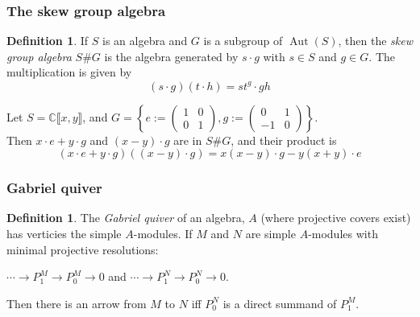 \documentclass[screen, aspectratio=43]{beamer}
\theoremstyle{definition}
\newtheorem{defin}[theorem]{Definition}
\newcommand{\C}{\mathbb{C}}
\DeclareMathOperator{\Aut}{Aut}
\begin{document}
\begin{frame}
	\frametitle{The skew group algebra}
	\begin{defin}
		If $S$ is an algebra and $G$ is a subgroup of $\Aut(S)$, then the \textit{skew group algebra} $S\#G$ is the algebra generated by $s \cdot g$ with $s \in S$ and $g \in G$. The multiplication is given by $$(s \cdot g)(t \cdot h) = s t^g \cdot gh$$
	\end{defin}
	\begin{example}
		Let $S= \C \llbracket x, y \rrbracket$, and $G = \left\{ e:= \begin{pmatrix}
		1 & 0\\
		0 & 1
		\end{pmatrix}, g:= \begin{pmatrix}
		0 & 1\\
		-1 & 0
		\end{pmatrix} \right\}$. \\
		Then $x \cdot e + y\cdot g$ and $(x-y) \cdot g$ are in $S\#G$, and their product is $$(x \cdot e + y\cdot g)((x-y) \cdot g) = x(x-y) \cdot g - y(x+y) \cdot e$$
	\end{example}
\end{frame}

\begin{frame}
	\frametitle{Gabriel quiver}
	\begin{defin}
		The \textit{Gabriel quiver} of an algebra, $A$ (where projective covers exist) has verticies the simple $A$-modules. If $M$ and $N$ are simple $A$-modules with minimal projective resolutions:
		\begin{center}
		$
		\cdots \to P^M_1 \to P^M_0 \to 0
		$
		\hspace{1cm}
		and
		\hspace{1cm}
		$
		\cdots \to P^N_1 \to P^N_0 \to 0
		$.
		\end{center}
		Then there is an arrow from $M$ to $N$ iff $P^N_0$ is a direct summand of $P^M_1$.
	\end{defin}
\end{frame}
\end{document}
